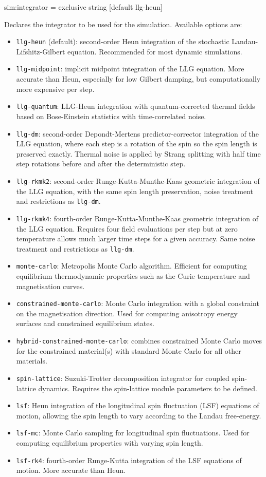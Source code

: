 {\zicf sim:integrator = exclusive string [default llg-heun]} Declares the integrator to be used for the simulation. Available options are:
\begin{itemize}
  \item[] \texttt{llg-heun} (default): second-order Heun integration of the stochastic Landau-Lifshitz-Gilbert equation. Recommended for most dynamic simulations.
  \item[] \texttt{llg-midpoint}: implicit midpoint integration of the LLG equation. More accurate than Heun, especially for low Gilbert damping, but computationally more expensive per step.
  \item[] \texttt{llg-quantum}: LLG-Heun integration with quantum-corrected thermal fields based on Bose-Einstein statistics with time-correlated noise.
  \item[] \texttt{llg-dm}: second-order Depondt-Mertens predictor-corrector integration of the LLG equation, where each step is a rotation of the spin so the spin length is preserved exactly. Thermal noise is applied by Strang splitting with half time step rotations before and after the deterministic step.
  \item[] \texttt{llg-rkmk2}: second-order Runge-Kutta-Munthe-Kaas geometric integration of the LLG equation, with the same spin length preservation, noise treatment and restrictions as \texttt{llg-dm}.
  \item[] \texttt{llg-rkmk4}: fourth-order Runge-Kutta-Munthe-Kaas geometric integration of the LLG equation. Requires four field evaluations per step but at zero temperature allows much larger time steps for a given accuracy. Same noise treatment and restrictions as \texttt{llg-dm}.
  \item[] \texttt{monte-carlo}: Metropolis Monte Carlo algorithm. Efficient for computing equilibrium thermodynamic properties such as the Curie temperature and magnetisation curves.
  \item[] \texttt{constrained-monte-carlo}: Monte Carlo integration with a global constraint on the magnetisation direction. Used for computing anisotropy energy surfaces and constrained equilibrium states.
  \item[] \texttt{hybrid-constrained-monte-carlo}: combines constrained Monte Carlo moves for the constrained material(s) with standard Monte Carlo for all other materials.
  \item[] \texttt{spin-lattice}: Suzuki-Trotter decomposition integrator for coupled spin-lattice dynamics. Requires the spin-lattice module parameters to be defined.
  \item[] \texttt{lsf}: Heun integration of the longitudinal spin fluctuation (LSF) equations of motion, allowing the spin length to vary according to the Landau free-energy.
  \item[] \texttt{lsf-mc}: Monte Carlo sampling for longitudinal spin fluctuations. Used for computing equilibrium properties with varying spin length.
  \item[] \texttt{lsf-rk4}: fourth-order Runge-Kutta integration of the LSF equations of motion. More accurate than Heun.
\end{itemize}

